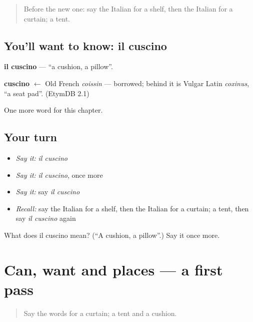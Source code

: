 \begin{quote}
Before the new one: say the Italian for a shelf, then the Italian for a curtain; a tent.
\end{quote}

\subsection*{You'll want to know: il cuscino}
\textbf{il cuscino} — \textquotedblleft{}a cushion, a pillow\textquotedblright{}.

\begin{cousinweb}
\textbf{cuscino} $\leftarrow$ Old French \emph{coissin} — borrowed; behind it is Vulgar Latin \emph{coxinus}, \textquotedblleft{}a seat pad\textquotedblright{}. (EtymDB 2.1)
\end{cousinweb}

\begin{grammarlens}[title={What you've built}]
One more word for this chapter.
\end{grammarlens}

\subsection*{Your turn}
\begin{itemize}
\raggedright
  \item \emph{Say it:} \emph{il cuscino}
  \item \emph{Say it:} \emph{il cuscino}, once more
  \item \emph{Say it:} say \emph{il cuscino}
  \item \emph{Recall:} say the Italian for a shelf, then the Italian for a curtain; a tent, then say \emph{il cuscino} again
\end{itemize}

\begin{tcolorbox}[breakable,colback=teal!4,colframe=teal!35!black,title={Before you move on}]
What does il cuscino mean? (\textquotedblleft{}A cushion, a pillow\textquotedblright{}.) Say it once more.
\end{tcolorbox}
\section[(dialogue)]{Can, want and places — a first pass}

\label{lesson:IT-R95-first-pass-can-want-and-places}



\begin{quote}
Say the words for a curtain; a tent and a cushion.
\end{quote}

